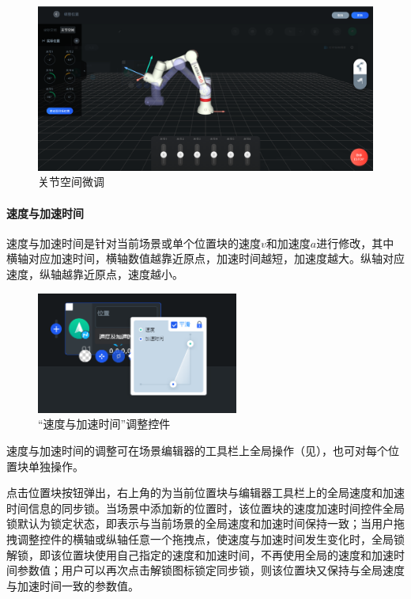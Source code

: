 \begin{figure}[ht]
	\centering
	\includegraphics[width=\textwidth]{screen/3-10.png}
	\caption{关节空间微调}
	\label{fig:关节空间微调}
\end{figure}

\paragraph{速度与加速时间}
速度与加速时间是针对当前场景或单个位置块的速度$v$和加速度$a$进行修改，其中横轴对应加速时间，横轴数值越靠近原点，加速时间越短，加速度越大。纵轴对应速度，纵轴越靠近原点，速度越小。

\begin{figure}[ht]
	\centering
	\includegraphics[height=4cm]{screen/3-11.png}
	\caption{“速度与加速时间”调整控件}
	\label{fig:速度与加速时间}
\end{figure}

速度与加速时间的调整可在场景编辑器的工具栏上全局操作（见），也可对每个位置块单独操作。

点击位置块按钮弹出，右上角的为当前位置块与编辑器工具栏上的全局速度和加速时间信息的同步锁。当场景中添加新的位置时，该位置块的速度加速时间控件全局锁默认为锁定状态，即表示与当前场景的全局速度和加速时间保持一致；当用户拖拽调整控件的横轴或纵轴任意一个拖拽点，使速度与加速时间发生变化时，全局锁解锁，即该位置块使用自己指定的速度和加速时间，不再使用全局的速度和加速时间参数值；用户可以再次点击解锁图标锁定同步锁，则该位置块又保持与全局速度与加速时间一致的参数值。

